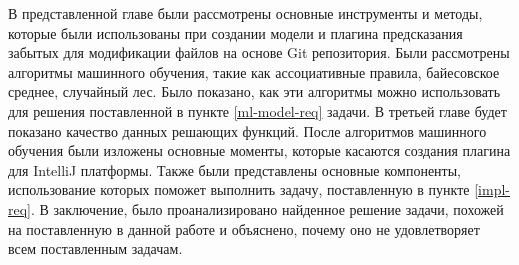 \chapterconclusion
В представленной главе были рассмотрены основные инструменты и методы, которые были использованы при создании модели и плагина предсказания забытых для модификации файлов на основе Git репозитория. Были рассмотрены алгоритмы машинного обучения, такие как ассоциативные правила, байесовское среднее, случайный лес. Было показано, как эти алгоритмы можно использовать для решения поставленной в пункте \ref{ml-model-req} задачи. В третьей главе будет показано качество данных решающих функций. После алгоритмов машинного обучения были изложены основные моменты, которые касаются создания плагина для IntelliJ платформы. Также были представлены основные компоненты, использование которых поможет выполнить задачу, поставленную в пункте \ref{impl-req}. В заключение, было проанализировано найденное решение задачи, похожей на поставленную в данной работе и объяснено, почему оно не удовлетворяет всем поставленным задачам.
